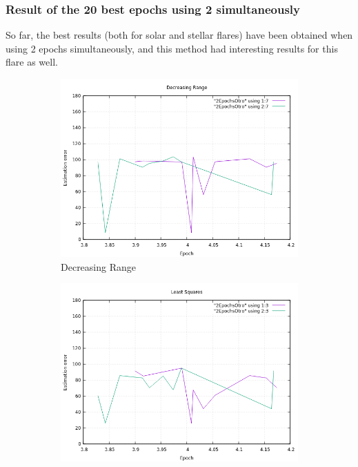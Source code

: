 \clearpage
\subsubsection{Result of the 20 best epochs using 2 simultaneously}

So far, the best results (both for solar and stellar flares) have been obtained when using 2 epochs simultaneously, and this method had interesting results for this flare as well.

\begin{figure}[!htb]
	\begin{subfigure}[b]{0.5\textwidth}
		\includegraphics[width=\linewidth]{images/resultsStellar/20Epochs2Epochs/2EpochsOtroDR.png}
		\caption{Decreasing Range}
	\end{subfigure}
	\hfill
	\begin{subfigure}[b]{0.5\textwidth}
		\includegraphics[width=\linewidth]{images/resultsStellar/20Epochs2Epochs/2EpochsOtroLS1.png}

\end{subfigure}
\end{figure}
